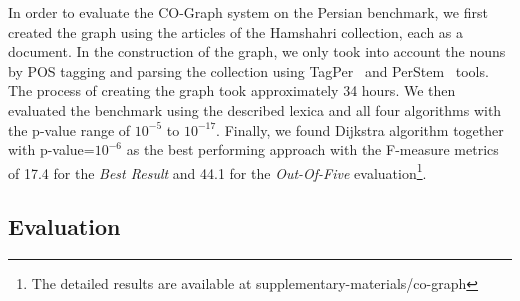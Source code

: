 
In order to evaluate the CO-Graph system on the Persian benchmark, we first created the graph using the articles of the Hamshahri collection, each as a document. In the construction of the graph, we only took into account the nouns by POS tagging and parsing the collection using TagPer~\cite{seraji2012} and PerStem~\cite{dehdari2008link} tools. The process of creating the graph took approximately 34 hours. We then evaluated the benchmark using the described lexica and all four algorithms with the p-value range of $10^{-5}$ to $10^{-17}$. Finally, we found Dijkstra algorithm together with p-value=$10^{-6}$ as the best performing approach with the F-measure metrics of 17.4 for the \emph{Best Result} and 44.1 for the \emph{Out-Of-Five} evaluation\footnote{The detailed results are available at supplementary-materials/co-graph}. %

\vspace{-0.2cm}
\subsection{Evaluation}

